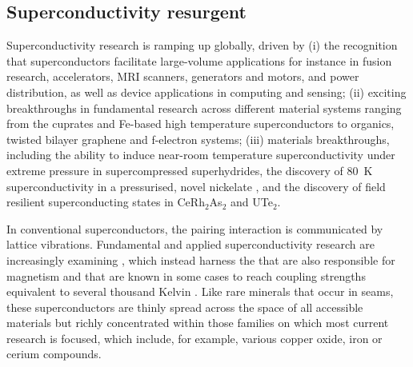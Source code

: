 \twocolumngrid


\subsection*{Superconductivity resurgent}
\noindent
Superconductivity research is ramping up globally, driven by (i) the recognition that superconductors facilitate large-volume applications for instance in fusion research, accelerators, MRI scanners, generators and motors, and power distribution, as well as device applications in computing and sensing; (ii) exciting breakthroughs in fundamental research across different material systems ranging from the cuprates and Fe-based high temperature superconductors to organics, twisted bilayer graphene and f-electron systems; (iii) materials breakthroughs, including the ability to induce near-room temperature superconductivity under extreme pressure in supercompressed superhydrides, the discovery of \SI{80}{\kelvin} superconductivity in a pressurised, novel nickelate \cite{sun23}, and the discovery of field resilient superconducting states in CeRh$_2$As$_2$ and UTe$_2$. 



In conventional superconductors, the pairing interaction is communicated by lattice vibrations. Fundamental and applied superconductivity research are increasingly examining , which instead harness the  that are also responsible for magnetism and that are
known in some cases to reach coupling strengths equivalent to several
thousand Kelvin \cite{monthoux07,norman11}. Like rare minerals that occur in seams, these superconductors are thinly spread across the space of all accessible materials but richly concentrated within those families on which most current research is focused, which include, for example, various copper oxide, iron or cerium compounds. 

